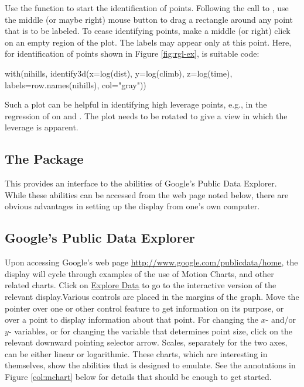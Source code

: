 Use the function  to start the identification of
points.  Following the call to , use the middle (or
maybe right) mouse button to drag a rectangle around any point that is
to be labeled.  To cease identifying points, make a middle (or right)
click on an empty region of the plot.  The labels may appear only at
this point.  Here, for identification of points shown in Figure
\ref{fig:rgl-ex}, is suitable code:
\begin{Schunk}
\begin{Sinput}
with(nihills, identify3d(x=log(dist), y=log(climb),
                         z=log(time),
                         labels=row.names(nihills),
                         col="gray"))
\end{Sinput}
\end{Schunk}

Such a plot can be helpful in identifying high leverage points,
e.g., in the regression of  on 
and .  The plot needs to be rotated to give a view
in which the leverage is apparent.

\subsection{The  Package}\label{sec:gvis}

This provides an interface to the abilities of Google's Public Data
Explorer.  While these abilities can be accessed from the web page
noted below, there are obvious advantages in setting up the display
from one's own computer.

\subsection*{Google's Public Data Explorer}

Upon accessing Google's web page
\url{http://www.google.com/publicdata/home}, the display will cycle
through examples of the use of Motion Charts, and other related
charts.  Click on \underline{Explore Data} to go to the interactive
version of the relevant display.Various controls are placed
  in the margins of the graph.  Move the pointer over one or other
  control feature to get information on its purpose, or over a point
  to display information about that point. For changing the $x$-
  and/or $y$- variables, or for changing the variable that determines
  point size, click on the relevant downward pointing selector arrow.
  Scales, separately for the two axes, can be either linear or
  logarithmic.  These charts, which are interesting in themselves,
show the abilities that  is designed to emulate.  See
the annotations in Figure \ref{col:mchart} below for details that
should be enough to get started.

